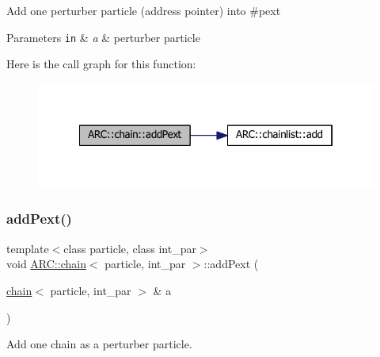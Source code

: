 Add one perturber particle (address pointer) into \#pext 
\begin{DoxyParams}[1]{Parameters}
\mbox{\tt in}  & {\em a} & perturber particle \\
\hline
\end{DoxyParams}
Here is the call graph for this function\+:
\nopagebreak
\begin{figure}[H]
\begin{center}
\leavevmode
\includegraphics[width=322pt]{classARC_1_1chain_ab6892980b326bd0bbe8a873a71892801_cgraph}
\end{center}
\end{figure}
\hypertarget{classARC_1_1chain_a964e4afb654f3d380969aa2326a287cc}{}\label{classARC_1_1chain_a964e4afb654f3d380969aa2326a287cc} 
\subsubsection{\texorpdfstring{add\+Pext()}{addPext()}\hspace{0.1cm}{\footnotesize\ttfamily [2/3]}}
{\footnotesize\ttfamily template$<$class particle, class int\+\_\+par$>$ \\
void \hyperlink{classARC_1_1chain}{A\+R\+C\+::chain}$<$ particle, int\+\_\+par $>$\+::add\+Pext (\begin{DoxyParamCaption}\item[{\hyperlink{classARC_1_1chain}{chain}$<$ particle, int\+\_\+par $>$ \&}]{a }\end{DoxyParamCaption})\hspace{0.3cm}{\ttfamily [inline]}}



Add one chain as a perturber particle. 

